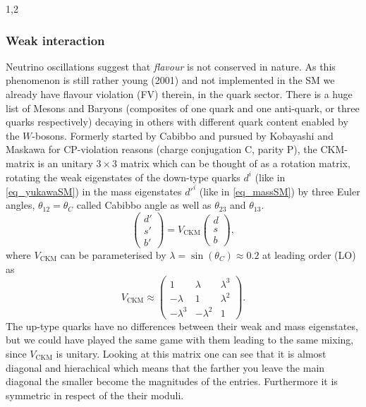\documentclass[11pt,a4paper,twoside]{article}
\begin{document}
\begin{spacing}{1,2}
\subsubsection*{Weak interaction}
Neutrino oscillations suggest that \textit{flavour} is not conserved in nature. As this phenomenon is still rather young (2001) and not implemented in the 
SM we already have flavour violation (FV) therein, in the quark sector. There is a huge list of Mesons and Baryons (composites of one quark and one anti-quark,
or three quarks respectively) decaying in others with different quark content enabled by the $W$-bosons. Formerly started by Cabibbo and pursued by 
Kobayashi and Maskawa for CP-violation reasons (charge conjugation C, parity P), the CKM-matrix is an unitary $3\times 3$ matrix which can be thought of as a rotation
matrix, rotating the weak eigenstates of the down-type quarks $d^i$ (like in \eqref{eq_yukawaSM}) in the mass eigenstates $d'^i$ 
(like in \eqref{eq_massSM}) by three Euler angles, $\theta_{12} = \theta_C$ called Cabibbo angle as well as $\theta_{23}$ and $\theta_{13}$.
\begin{equation}
 \begin{pmatrix}
  d' \\ s' \\ b'
 \end{pmatrix} = V_\text{CKM}  \begin{pmatrix}
  d \\ s \\ b
 \end{pmatrix},
\end{equation}
\noindent
where $V_\text{CKM}$ can be parameterised by $\lambda = \sin(\theta_C) \approx 0.2$ at leading order (LO) as
\begin{equation}
 V_\text{CKM} \approx \begin{pmatrix}
  1 & \lambda & \lambda^3\\
  -\lambda & 1 & \lambda^2\\
  -\lambda^3 & -\lambda^2 & 1
 \end{pmatrix}.
\end{equation}
The up-type quarks have no differences between their weak and mass eigenstates, but we could have played the same game with them leading to the 
same mixing, since $V_\text{CKM}$ is unitary. Looking at this matrix one can see that it is almost diagonal and hierachical which
means that the farther you leave the main diagonal the smaller become the magnitudes of the entries. Furthermore it is symmetric in respect of the 
their moduli.


\end{spacing}
\end{document}
